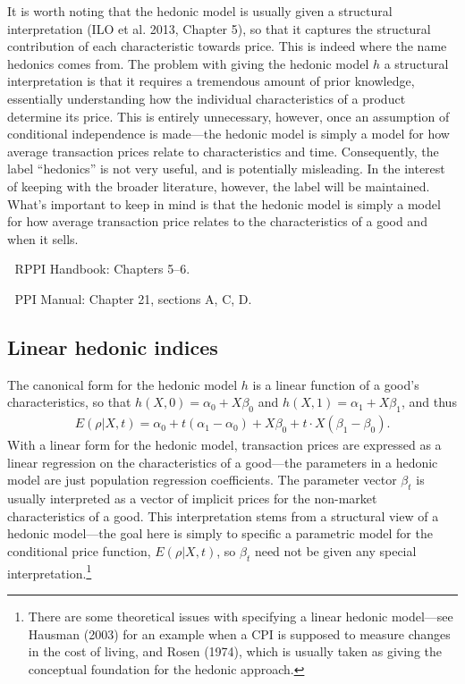 \documentclass[]{article}
\begin{document}
It is worth noting that the hedonic model is usually given a structural interpretation (ILO et al. 2013, Chapter 5), so that it captures the structural contribution of each characteristic towards price. This is indeed where the name hedonics comes from. The problem with giving the hedonic model \(h\) a structural interpretation is that it requires a tremendous amount of prior knowledge, essentially understanding how the individual characteristics of a product determine its price. This is entirely unnecessary, however, once an assumption of conditional independence is made---the hedonic model is simply a model for how average transaction prices relate to characteristics and time. Consequently, the label ``hedonics'' is not very useful, and is potentially misleading. In the interest of keeping with the broader literature, however, the label will be maintained. What's important to keep in mind is that the hedonic model is simply a model for how average transaction price relates to the characteristics of a good and when it sells.

📖 RPPI Handbook: Chapters 5--6.

📖 PPI Manual: Chapter 21, sections A, C, D.

\hypertarget{linear-hedonic-indices}{%
\subsection{Linear hedonic indices}\label{linear-hedonic-indices}}

The canonical form for the hedonic model \(h\) is a linear function of a good's characteristics, so that \(h(X, 0) = \alpha_{0} + X\beta_{0}\) and \(h(X, 1) = \alpha_{1} + X\beta_{1}\), and thus
\begin{align*}
E(\rho | X, t) = \alpha_{0} + t(\alpha_{1} - \alpha_{0}) + X\beta_{0} + t \cdot X (\beta_{1} - \beta_{0}).
\end{align*}
With a linear form for the hedonic model, transaction prices are expressed as a linear regression on the characteristics of a good---the parameters in a hedonic model are just population regression coefficients. The parameter vector \(\beta_{t}\) is usually interpreted as a vector of implicit prices for the non-market characteristics of a good. This interpretation stems from a structural view of a hedonic model---the goal here is simply to specific a parametric model for the conditional price function, \(E(\rho | X, t)\), so \(\beta_{t}\) need not be given any special interpretation.\footnote{There are some theoretical issues with specifying a linear hedonic model---see Hausman (2003) for an example when a CPI is supposed to measure changes in the cost of living, and Rosen (1974), which is usually taken as giving the conceptual foundation for the hedonic approach.}
\end{document}
